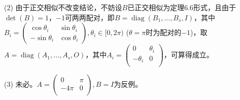 \documentclass[a4paper,UTF8,fontset=windows]{ctexart}
\DeclareMathOperator{\diag}{diag}
\begin{document}
\begin{enumerate}
(2) 由于正交相似不改变结论，不妨设$B$已正交相似为定理6.6形式，且由于$\det(B)=1$，$-1$可两两配对，即$B=\diag(B_1,\dots,B_s,I)$，其中$B_i=\begin{pmatrix}\cos\theta_i&\sin\theta_i\\-\sin\theta_i&\cos\theta_i\end{pmatrix},\theta_i\in[0,2\pi)$ ($\theta=\pi$时为配对的$-1$)，取$A=\diag(A_1,\dots,A_s,O)$，其中$A_i=\begin{pmatrix}0&\theta_i\\-\theta_i&0\\\end{pmatrix}$，可算得成立。

(3) 未必。$A=\begin{pmatrix}0&\pi\\-4\pi&0\\\end{pmatrix},B=I$为反例。
\end{enumerate}
\end{document}
